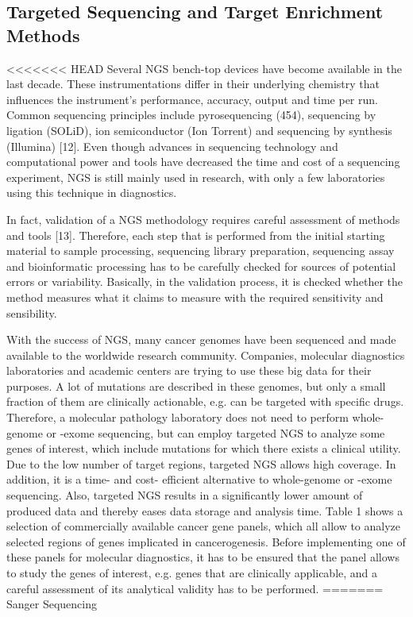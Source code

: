 \subsection{Targeted Sequencing and Target Enrichment Methods}

<<<<<<< HEAD
Several NGS bench-top devices have become available in the last decade. These instrumentations differ in their underlying chemistry that influences the instrument’s performance, accuracy, output and time per run. Common sequencing principles include pyrosequencing (454), sequencing by ligation (SOLiD), ion semiconductor (Ion Torrent) and sequencing by synthesis (Illumina) [12]. Even though advances in sequencing technology and computational power and tools have decreased the time and cost of a sequencing experiment, NGS is still mainly used in research, with only a few laboratories using this technique in diagnostics.

In fact, validation of a NGS methodology requires careful assessment of methods and tools [13]. Therefore, each step that is performed from the initial starting material to sample processing, sequencing library preparation, sequencing assay and bioinformatic processing has to be carefully checked for sources of potential errors or variability. Basically, in the validation process, it is checked whether the method measures what it claims to measure with the required sensitivity and sensibility.

With the success of NGS, many cancer genomes have been sequenced and made available to the worldwide research community. Companies, molecular diagnostics laboratories and academic centers are trying to use these big data for their purposes. A lot of mutations are described in these genomes, but only a small fraction of them are clinically actionable, e.g. can be targeted with specific drugs. Therefore, a molecular pathology laboratory does not need to perform whole-genome or -exome sequencing, but can employ targeted NGS to analyze some genes of interest, which include mutations for which there exists a clinical utility. Due to the low number of target regions, targeted NGS allows high coverage. In addition, it is a time- and cost- efficient alternative to whole-genome or -exome sequencing. Also, targeted NGS results in a significantly lower amount of produced data and thereby eases data storage and analysis time. Table 1 shows a selection of commercially available cancer gene panels, which all allow to analyze selected regions of genes implicated in cancerogenesis. Before implementing one of these panels for molecular diagnostics, it has to be ensured that the panel allows to study the genes of interest, e.g. genes that are clinically applicable, and a careful assessment of its analytical validity has to be performed.
=======
Sanger Sequencing

